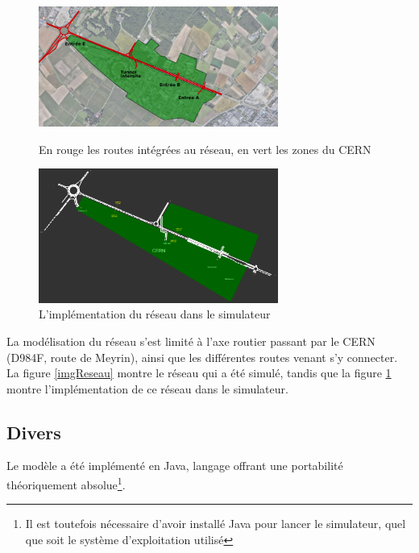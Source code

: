 \documentclass[a4paper,11pt, titlepage]{extarticle}
\begin{document}
\begin{figure}[!h]
  \begin{center}
    \includegraphics[width=0.7\textwidth]{images/reseauRoutier.png}
  \end{center}
  \vspace{-0.4cm}
  \caption{En rouge les routes intégrées au réseau, en vert les zones du CERN}
  \label{imgReseau}
  \begin{center}
    \includegraphics[width=0.7\textwidth]{images/simulateurReseau.png}
  \end{center}
  \vspace{-0.4cm}
  \caption{L'implémentation du réseau dans le simulateur}
  \label{imgReseauSim}
\end{figure}


La modélisation du réseau s'est limité à l'axe routier passant par le CERN (D984F, route de Meyrin), ainsi que les différentes routes venant s'y connecter. La figure \ref{imgReseau} montre le réseau qui a été simulé, tandis que la figure \ref{imgReseauSim} montre l'implémentation de ce réseau dans le simulateur.

\subsection{Divers}

Le modèle a été implémenté en Java, langage offrant une portabilité théoriquement absolue\footnote{Il est toutefois nécessaire d'avoir installé Java pour lancer le simulateur, quel que soit le système d'exploitation utilisé}.
\end{document}
